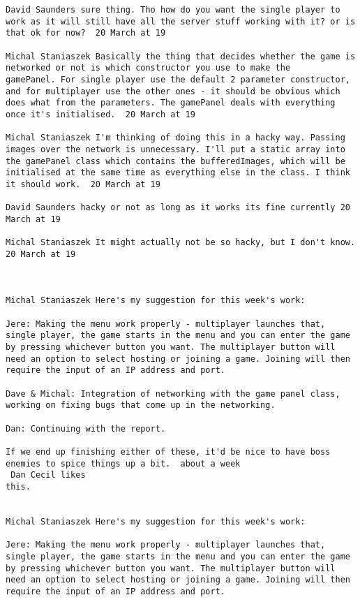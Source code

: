 \begin{verbatim}
David Saunders sure thing. Tho how do you want the single player to
work as it will still have all the server stuff working with it? or is
that ok for now?  20 March at 19

Michal Staniaszek Basically the thing that decides whether the game is
networked or not is which constructor you use to make the
gamePanel. For single player use the default 2 parameter constructor,
and for multiplayer use the other ones - it should be obvious which
does what from the parameters. The gamePanel deals with everything
once it's initialised.  20 March at 19

Michal Staniaszek I'm thinking of doing this in a hacky way. Passing
images over the network is unnecessary. I'll put a static array into
the gamePanel class which contains the bufferedImages, which will be
initialised at the same time as everything else in the class. I think
it should work.  20 March at 19

David Saunders hacky or not as long as it works its fine currently 20
March at 19

Michal Staniaszek It might actually not be so hacky, but I don't know.
20 March at 19



Michal Staniaszek Here's my suggestion for this week's work:

Jere: Making the menu work properly - multiplayer launches that,
single player, the game starts in the menu and you can enter the game
by pressing whichever button you want. The multiplayer button will
need an option to select hosting or joining a game. Joining will then
require the input of an IP address and port.

Dave & Michal: Integration of networking with the game panel class,
working on fixing bugs that come up in the networking.

Dan: Continuing with the report.

If we end up finishing either of these, it'd be nice to have boss
enemies to spice things up a bit.  about a week 
 Dan Cecil likes
this.


Michal Staniaszek Here's my suggestion for this week's work:

Jere: Making the menu work properly - multiplayer launches that,
single player, the game starts in the menu and you can enter the game
by pressing whichever button you want. The multiplayer button will
need an option to select hosting or joining a game. Joining will then
require the input of an IP address and port.


\end{verbatim}
